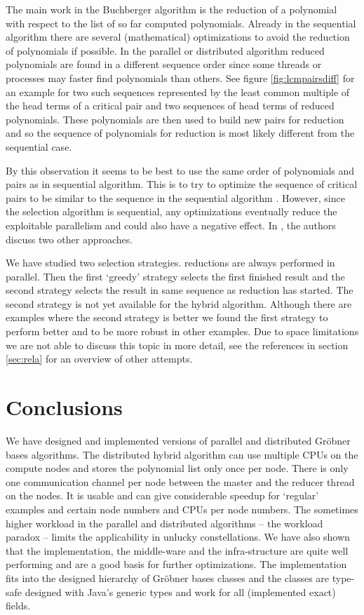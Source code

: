 \documentclass[10pt,twocolumn,a4paper]{article}
\begin{document}
The main work in the Buchberger algorithm is the reduction of a
polynomial with respect to the list of so far computed polynomials.
Already in the sequential algorithm there are several (mathematical)
optimizations to avoid the reduction of polynomials if possible. In
the parallel or distributed algorithm reduced polynomials are found in
a different sequence order since some threads or processes may faster
find polynomials than others. 
See figure \ref{fig:lcmpairsdiff} for an example for two such
sequences represented by the least common multiple of the head terms
of a critical pair and two sequences of head terms of reduced polynomials.
These polynomials are then used to build new pairs for reduction and
so the sequence of polynomials for reduction is most likely different
from the sequential case.

By this observation it seems to be best to use the same order of
polynomials and pairs as in sequential algorithm.  This is to try to
optimize the sequence of critical pairs to be similar to the sequence
in the sequential algorithm \cite{AttardiTraverso:1996}.
However, since the selection algorithm is sequential, any
optimizations eventually reduce the exploitable parallelism and could
also have a negative effect.
In \cite{Amrhein:1996}, the authors discuss two other approaches.  

We have studied two selection strategies.   reductions are always
performed in parallel.  Then the first `greedy' strategy selects the
first finished result and the second strategy selects the result in
same sequence as reduction has started.  The second strategy is not
yet available for the hybrid algorithm. Although there are examples
where the second strategy is better we found the first strategy to
perform better and to be more robust in other examples.
Due to space limitations we are not able to discuss this topic in more detail,
see the references in section \ref{sec:rela} for an overview of other attempts.


\section{Conclusions} 



We have designed and implemented versions of parallel and distributed
Gr\"obner bases algorithms.  The distributed hybrid algorithm can use
multiple CPUs on the compute nodes and stores the polynomial list only
once per node. There is only one communication channel per node
between the master and the reducer thread on the nodes.  It is usable
and can give considerable speedup for `regular' examples and certain
node numbers and CPUs per node numbers.  The sometimes higher workload
in the parallel and distributed algorithms -- the workload paradox --
limits the applicability in unlucky constellations.  We have also shown
that the implementation, the middle-ware and the infra-structure are
quite well performing and are a good basis for further optimizations.
The implementation fits into the designed hierarchy of Gr\"obner bases
classes and the classes are type-safe designed with Java's generic
types and work for all (implemented exact) fields.
\end{document}
